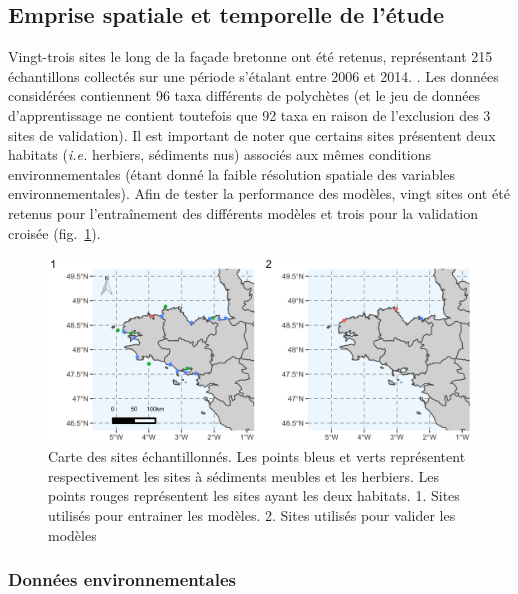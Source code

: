 \documentclass[12pt,]{article}
\makeatletter
\def\maxwidth{\ifdim\Gin@nat@width>\linewidth\linewidth
\else\Gin@nat@width\fi}
\let\Oldincludegraphics\includegraphics
\renewcommand{\includegraphics}[1]{\Oldincludegraphics[width=\maxwidth]{#1}}
\makeatother
\begin{document}
\hypertarget{emprise-spatiale-et-temporelle-de-luxe9tude}{%
\subsection{Emprise spatiale et temporelle de
l'étude}\label{emprise-spatiale-et-temporelle-de-luxe9tude}}

Vingt-trois sites le long de la façade bretonne ont été retenus,
représentant 215 échantillons collectés sur une période s'étalant entre
2006 et 2014. . Les données considérées contiennent 96 taxa différents
de polychètes (et le jeu de données d'apprentissage ne contient
toutefois que 92 taxa en raison de l'exclusion des 3 sites de
validation). Il est important de noter que certains sites présentent
deux habitats (\emph{i.e.} herbiers, sédiments nus) associés aux mêmes
conditions environnementales (étant donné la faible résolution spatiale
des variables environnementales). Afin de tester la performance des
modèles, vingt sites ont été retenus pour l'entraînement des différents
modèles et trois pour la validation croisée (fig.~\ref{fig:sitemap}).

\begin{figure}
\hypertarget{fig:sitemap}{%
\centering
\includegraphics{figures/site_map.png}
\caption{Carte des sites échantillonnés. Les points bleus et verts
représentent respectivement les sites à sédiments meubles et les
herbiers. Les points rouges représentent les sites ayant les deux
habitats. 1. Sites utilisés pour entrainer les modèles. 2. Sites
utilisés pour valider les modèles}\label{fig:sitemap}
}
\end{figure}

\hypertarget{donnuxe9es-environnementales}{%
\subsubsection{Données
environnementales}\label{donnuxe9es-environnementales}}
\end{document}
